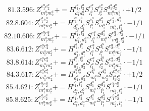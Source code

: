 \documentclass[letterpaper,10pt,fleqn,leqno,onecolumn]{article}
\begin{document}
\begin{equation} \;\;\;\;\;\;  81.3.596: Z^{e_{1}^{a}e_{2}^{a}}_{m_{1}^{a}m_{2}^{a}}+=H^{l_{1}^{a},l_{2}^{a}}_{d_{1}^{a}d_{2}^{a}}S^{e_{1}^{a}}_{l_{1}^{a}}S^{e_{2}^{a}}_{l_{2}^{a}}S^{d_{1}^{a}d_{2}^{a}}_{m_{1}^{a}m_{2}^{a}}\cdot +1/2 \end{equation}
\begin{equation} \;\;\;\;\;\;  82.8.604: Z^{e_{1}^{a}e_{2}^{a}}_{m_{1}^{a}m_{2}^{a}}+=H^{l_{1}^{a},l_{1}^{b}}_{d_{1}^{a},d_{1}^{b}}S^{e_{1}^{a}}_{l_{1}^{a}}S^{d_{1}^{a}}_{m_{1}^{a}}S^{e_{2}^{a},d_{1}^{b}}_{m_{2}^{a},l_{1}^{b}}\cdot -1/1 \end{equation}
\begin{equation} \;\;\;\;\;\;  82.10.606: Z^{e_{1}^{a}e_{2}^{a}}_{m_{1}^{a}m_{2}^{a}}+=H^{l_{1}^{a},l_{2}^{a}}_{d_{1}^{a},d_{2}^{a}}S^{e_{1}^{a}}_{l_{1}^{a}}S^{d_{1}^{a}}_{m_{1}^{a}}S^{e_{2}^{a},d_{2}^{a}}_{m_{2}^{a},l_{2}^{a}}\cdot -1/1 \end{equation}
\begin{equation} \;\;\;\;\;\;  83.6.612: Z^{e_{1}^{a}e_{2}^{a}}_{m_{1}^{a}m_{2}^{a}}+=H^{l_{1}^{a},l_{1}^{b}}_{d_{1}^{b},d_{1}^{a}}S^{e_{1}^{a}}_{l_{1}^{a}}S^{d_{1}^{b}}_{l_{1}^{b}}S^{e_{2}^{a},d_{1}^{a}}_{m_{1}^{a}m_{2}^{a}}\cdot -1/1 \end{equation}
\begin{equation} \;\;\;\;\;\;  83.8.614: Z^{e_{1}^{a}e_{2}^{a}}_{m_{1}^{a}m_{2}^{a}}+=H^{l_{1}^{a},l_{2}^{a}}_{d_{1}^{a},d_{2}^{a}}S^{e_{1}^{a}}_{l_{1}^{a}}S^{d_{1}^{a}}_{l_{2}^{a}}S^{e_{2}^{a},d_{2}^{a}}_{m_{1}^{a}m_{2}^{a}}\cdot -1/1 \end{equation}
\begin{equation} \;\;\;\;\;\;  84.3.617: Z^{e_{1}^{a}e_{2}^{a}}_{m_{1}^{a}m_{2}^{a}}+=H^{l_{1}^{a}l_{2}^{a}}_{d_{1}^{a},d_{2}^{a}}S^{d_{1}^{a}}_{m_{1}^{a}}S^{d_{2}^{a}}_{m_{2}^{a}}S^{e_{1}^{a}e_{2}^{a}}_{l_{1}^{a}l_{2}^{a}}\cdot +1/2 \end{equation}
\begin{equation} \;\;\;\;\;\;  85.4.621: Z^{e_{1}^{a}e_{2}^{a}}_{m_{1}^{a}m_{2}^{a}}+=H^{l_{1}^{b},l_{1}^{a}}_{d_{1}^{a},d_{1}^{b}}S^{d_{1}^{a}}_{m_{1}^{a}}S^{d_{1}^{b}}_{l_{1}^{b}}S^{e_{1}^{a}e_{2}^{a}}_{m_{2}^{a},l_{1}^{a}}\cdot -1/1 \end{equation}
\begin{equation} \;\;\;\;\;\;  85.8.625: Z^{e_{1}^{a}e_{2}^{a}}_{m_{1}^{a}m_{2}^{a}}+=H^{l_{1}^{a},l_{2}^{a}}_{d_{1}^{a},d_{2}^{a}}S^{d_{1}^{a}}_{m_{1}^{a}}S^{d_{2}^{a}}_{l_{1}^{a}}S^{e_{1}^{a}e_{2}^{a}}_{m_{2}^{a},l_{2}^{a}}\cdot -1/1 \end{equation}
\end{document}
